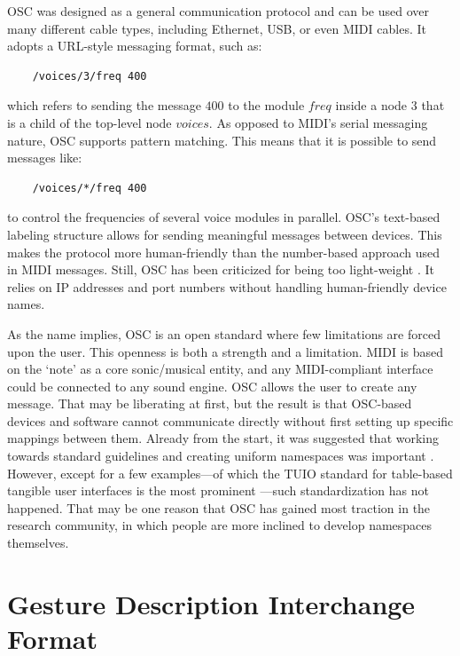 OSC was designed as a general communication protocol and can be used over many different cable types, including Ethernet, USB, or even MIDI cables. It adopts a URL-style messaging format, such as:

\begin{verbatim}
	/voices/3/freq 400
\end{verbatim}

\noindent
which refers to sending the message $400$ to the module $freq$ inside a node $3$ that is a child of the top-level node $voices$. As opposed to MIDI's serial messaging nature, OSC supports pattern matching. This means that it is possible to send messages like:

\begin{verbatim}
	/voices/*/freq 400
\end{verbatim}

\noindent
to control the frequencies of several voice modules in parallel.
OSC's text-based labeling structure allows for sending meaningful messages between devices. This makes the protocol more human-friendly than the number-based approach used in MIDI messages. Still, OSC has been criticized for being too light-weight \citep{dannenberg_o2:_2016}. It relies on IP addresses and port numbers without handling human-friendly device names.

As the name implies, OSC is an open standard where few limitations are forced upon the user. This openness is both a strength and a limitation.
MIDI is based on the `note' as a core sonic/musical entity, and any MIDI-compliant interface could be connected to any sound engine. OSC allows the user to create any message. That may be liberating at first, but the result is that OSC-based devices and software cannot communicate directly without first setting up specific mappings between them. Already from the start, it was suggested that working towards standard guidelines and creating uniform namespaces was important \citep{wright_managing_2001}. However, except for a few examples---of which the TUIO standard for table-based tangible user interfaces is the most prominent \citep{kaltenbrunner_tuio_2005}---such standardization has not happened. That may be one reason that OSC has gained  most traction in the research community, in which people are more inclined to develop namespaces themselves.


\section{Gesture Description Interchange Format}\label{sec:gdif}

